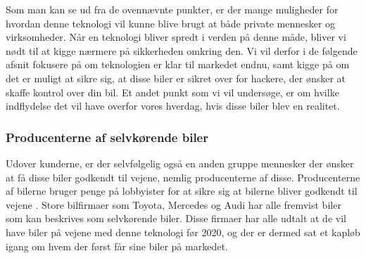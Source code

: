 Som man kan se ud fra de ovennævnte punkter, er der mange muligheder for hvordan denne teknologi vil kunne blive brugt at både private mennesker og virksomheder. Når en teknologi bliver spredt i verden på denne måde, bliver vi nødt til at kigge nærmere på sikkerheden omkring den. Vi vil derfor i de følgende afsnit fokusere på om teknologien er klar til markedet endnu, samt kigge på om det er muligt at sikre sig, at disse biler er sikret over for hackere, der ønsker at skaffe kontrol over din bil. Et andet punkt som vi vil undersøge, er om hvilke indflydelse det vil have overfor vores hverdag, hvis disse biler blev en realitet.

\subsubsection{Producenterne af selvkørende biler}
Udover kunderne, er der selvfølgelig også en anden gruppe mennesker der ønsker at få disse biler godkendt til vejene, nemlig producenterne af disse. Producenterne af bilerne bruger penge på lobbyister for at sikre sig at bilerne bliver godkendt til vejene \cite{soprweb}. Store bilfirmaer som Toyota, Mercedes og Audi har alle fremvist biler \cite{PopularMechanics} som kan beskrives som selvkørende biler. Disse firmaer har alle udtalt at de vil have biler på vejene med denne teknologi før 2020, og der er dermed sat et kapløb igang om hvem der først får sine biler på markedet. 